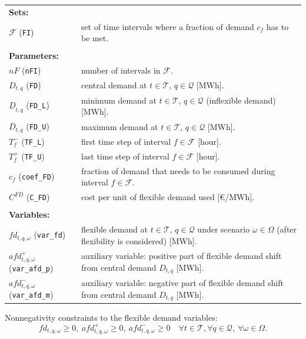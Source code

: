 \begin{tabularx}{\textwidth}{l X}
\textbf{Sets:} \\
$\mathcal{F}$ (\texttt{FI}) & set of time intervals where a fraction of demand $c_f$ has to be met. \\[1mm]
\\
\textbf{Parameters:} \\
$nF$ (\texttt{nFI}) & number of intervals in $\mathcal{F}$. \\
$D_{t,q}$ (\texttt{FD}) & central demand at $t \in \mathcal{T}$, $q \in \mathcal{Q}$ [MWh]. \\
$\underline{D}_{t,q}$ (\texttt{FD\_L}) & minimum demand at $t \in \mathcal{T}$, $q \in \mathcal{Q}$ (inflexible demand) [MWh]. \\
$\overline{D}_{t,q}$ (\texttt{FD\_U}) & maximum demand at $t \in \mathcal{T}$, $q \in \mathcal{Q}$ [MWh]. \\
$T_f^-$ (\texttt{TF\_L}) & first time step of interval $f \in \mathcal{F}$ [hour]. \\
$T_f^+$ (\texttt{TF\_U}) & last time step of interval $f \in \mathcal{F}$ [hour]. \\
$c_f$ (\texttt{coef\_FD}) & fraction of demand that needs to be consumed during interval $f \in \mathcal{F}$. \\
$C^{FD}$ (\texttt{C\_FD}) & cost per unit of flexible demand used [\euro/MWh]. \\[1mm]
\\
\textbf{Variables:} \\
$fd_{t,q, \omega}$ (\texttt{var\_fd}) & flexible demand at $t \in \mathcal{T}$, $q \in \mathcal{Q}$ under scenario $\omega \in \Omega$ (after flexibility is considered) [MWh]. \\
$afd_{t,q, \omega}^+$ (\texttt{var\_afd\_p}) & auxiliary variable: positive part of flexible demand shift from central demand $D_{t,q}$ [MWh]. \\
$afd_{t,q, \omega}^-$ (\texttt{var\_afd\_m}) & auxiliary variable: negative part of flexible demand shift from central demand $D_{t,q}$ [MWh]. \\
\end{tabularx}

Nonnegativity constraints to the flexible demand variables:
\begin{equation} \label{EQ:FlexDemandPos2}
	fd_{t,q, \omega} \geq 0, \ afd_{t,q, \omega}^+ \geq 0, \ afd_{t,q, \omega}^- \geq 0 \quad \forall t \in \mathcal{T}, \forall q \in \mathcal{Q}, \ \forall \omega \in \Omega.
\end{equation}

